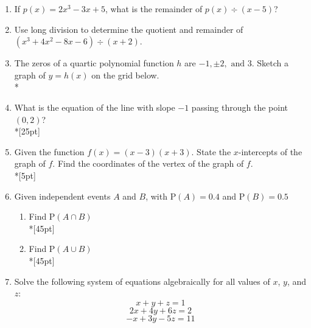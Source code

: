 \documentclass[12pt, oneside]{article}
\begin{document}
\begin{enumerate}
\newpage

\item If $p(x)=2x^3-3x+5$, what is the remainder of $p(x) \div (x-5)$? %
\vspace{6cm}

\item Use long division to determine the quotient and remainder of $(x^3+4x^2-8x-6) \div (x+2)$.

\newpage

\item The zeros of a quartic polynomial function $h$ are  $-1,\pm 2, \text{ and } 3$. Sketch a graph of $y = h(x)$ on the grid below.\\*
\begin{center}
\end{center}

\item What is the equation of the line with slope $-1$ passing through the point $(0, 2)$?\\*[25pt]


\item Given the function $f(x)=(x-3)(x+3)$. State the $x$-intercepts of the graph of $f$. Find the coordinates of the vertex of the graph of $f$.\\*[5pt]


\newpage

\item Given independent events $A$ and $B$, with $\mathrm P(A)=0.4$ and $\mathrm P(B)=0.5$
\begin{enumerate}
    \item Find $\mathrm P(A \cap B)$\\*[45pt]
    \item Find $\mathrm P(A \cup B)$\\*[45pt]
\end{enumerate}


\item Solve the following system of equations algebraically for all values of $x$, $y$, and $z$:
\[x +y+ z=1\]
\[2x+4y+6z=2\]
\[-x+3y-5z=11\]


\end{enumerate}
\end{document}
